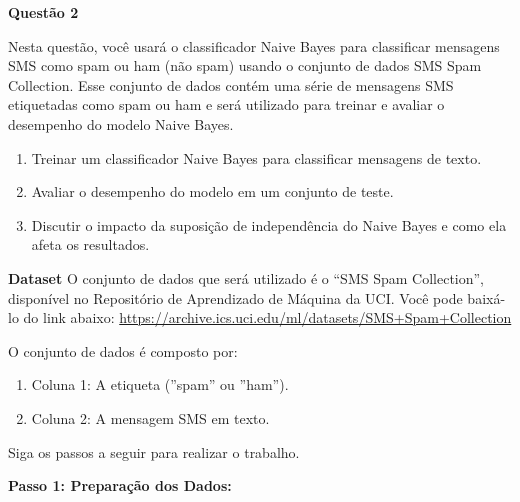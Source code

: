 \textbf{Questão 2}

Nesta questão, você usará o classificador Naive Bayes para classificar mensagens SMS como spam ou ham (não spam) usando o conjunto de dados SMS Spam Collection. Esse conjunto de dados contém uma série de mensagens SMS etiquetadas como spam ou ham e será utilizado para treinar e avaliar o desempenho do modelo Naive Bayes.

\begin{enumerate}
    \item Treinar um classificador Naive Bayes para classificar mensagens de texto.
    \item Avaliar o desempenho do modelo em um conjunto de teste.
    \item Discutir o impacto da suposição de independência do Naive Bayes e como ela afeta os resultados.
\end{enumerate}

\textbf{Dataset} O conjunto de dados que será utilizado é o “SMS Spam Collection”, disponível no Repositório de Aprendizado de Máquina da UCI. 
Você pode baixá-lo do link abaixo: \url{https://archive.ics.uci.edu/ml/datasets/SMS+Spam+Collection}

O conjunto de dados é composto por:

\begin{enumerate}
    \item Coluna 1: A etiqueta (”spam” ou ”ham”).
    \item Coluna 2: A mensagem SMS em texto.
\end{enumerate}

Siga os passos a seguir para realizar o trabalho.

\textbf{Passo 1: Preparação dos Dados:}

